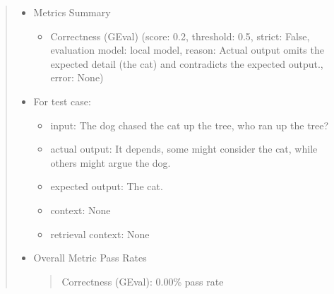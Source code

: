 \documentclass[letterpaper,11pt,english]{sphinxmanual}
\begin{document}
\begin{quote}
\begin{sphinxVerbatim}[commandchars=\\\{\}]
\PYG{p}{[}\PYG{p}{]} \PYG{p}{[}\PYG{p}{]}
\end{sphinxVerbatim}
\begin{itemize}
\item {} 
\sphinxAtStartPar
Metrics Summary
\begin{itemize}
\item {} 
\sphinxAtStartPar
Correctness (GEval) (score: 0.2, threshold: 0.5, strict: False, evaluation
model: local model, reason: Actual output omits the expected detail (the cat)
and contradicts the expected output., error: None)

\end{itemize}

\item {} 
\sphinxAtStartPar
For test case:
\begin{itemize}
\item {} 
\sphinxAtStartPar
input: The dog chased the cat up the tree, who ran up the tree?

\item {} 
\sphinxAtStartPar
actual output: It depends, some might consider the cat, while others might argue the dog.

\item {} 
\sphinxAtStartPar
expected output: The cat.

\item {} 
\sphinxAtStartPar
context: None

\item {} 
\sphinxAtStartPar
retrieval context: None

\end{itemize}

\item {} 
\sphinxAtStartPar
Overall Metric Pass Rates
\begin{quote}

\sphinxAtStartPar
Correctness (GEval): 0.00\% pass rate
\end{quote}

\end{itemize}
\end{quote}

\sphinxstepscope
\end{document}
